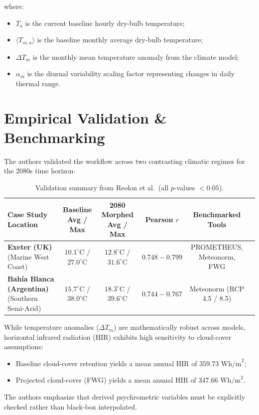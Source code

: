 \documentclass[10pt,a4paper]{article}
\begin{document}
where:
\begin{itemize}
    \item $T_a$ is the current baseline hourly dry-bulb temperature;
    \item $\langle T_{m,a} \rangle$ is the baseline monthly average dry-bulb temperature;
    \item $\Delta T_m$ is the monthly mean temperature anomaly from the climate model;
    \item $\alpha_m$ is the diurnal variability scaling factor representing changes in daily thermal range.
\end{itemize}

\section{Empirical Validation \& Benchmarking}
The authors validated the workflow across two contrasting climatic regimes for the 2080s time horizon:

\begin{table}[h!]
\centering
\small
\begin{tabularx}{\textwidth}{lccccr}
\toprule
\textbf{Case Study Location} & \textbf{Baseline Avg / Max} & \textbf{2080 Morphed Avg / Max} & \textbf{Pearson $r$} & \textbf{Benchmarked Tools} \\
\midrule
\textbf{Exeter (UK)} (Marine West Coast) & $10.1^\circ\text{C}$ / $27.0^\circ\text{C}$ & $12.8^\circ\text{C}$ / $31.6^\circ\text{C}$ & $0.748 - 0.799$ & PROMETHEUS, Meteonorm, FWG \\
\textbf{Bah\'ia Blanca (Argentina)} (Southern Semi-Arid) & $15.7^\circ\text{C}$ / $38.0^\circ\text{C}$ & $18.3^\circ\text{C}$ / $39.6^\circ\text{C}$ & $0.744 - 0.767$ & Meteonorm (RCP 4.5 / 8.5) \\
\bottomrule
\end{tabularx}
\caption{Validation summary from Reolon et al.\ (all $p$-values $< 0.05$).}
\end{table}

\begin{alertbox}
While temperature anomalies ($\Delta T_m$) are mathematically robust across models, horizontal infrared radiation (HIR) exhibits high sensitivity to cloud-cover assumptions:
\begin{itemize}
    \item Baseline cloud-cover retention yields a mean annual HIR of \textbf{$359.73\text{ Wh/m}^2$};
    \item Projected cloud-cover (FWG) yields a mean annual HIR of \textbf{$347.66\text{ Wh/m}^2$}.
\end{itemize}
The authors emphasize that derived psychrometric variables must be explicitly checked rather than black-box interpolated.
\end{alertbox}
\end{document}
